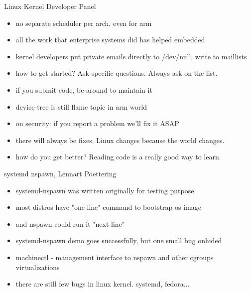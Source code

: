 \documentclass[aspectratio=169]{beamer}
\begin{document}
\begin{frame}{Linux Kernel Developer Panel}
  \begin{itemize}
  \item no separate scheduler per arch, even for arm
  \item all the work that enterprise systems did has helped embedded
  \item kernel developers put private emails directly to /dev/null, write to maillists
  \item how to get started? Ask specific questions. Always ask on the list.
  \item if you submit code, be around to maintain it
  \item device-tree is still flame topic in arm world
  \item on security: if you report a problem we'll fix it ASAP
  \item there will always be fixes. Linux changes because the world changes.
  \item how do you get better? Reading code is a really good way to learn.
  \end{itemize}
\end{frame}

\begin{frame}{systemd nspawn, Lennart Poettering}
  \begin{itemize}
  \item systemd-nspawn was written originally for testing purpose
  \item most distros have "one line" command to bootstrap os image
  \item and nspawn could run it "next line"
  \item systemd-nspawn demo goes successfully, but one small bug onhided
  \item machinectl - management interface to nspawn and other cgroups virtualizations
  \item there are still few bugs in linux kernel. systemd, fedora...
  \end{itemize}
\end{frame}
\end{document}
